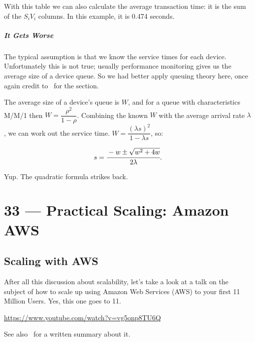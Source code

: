 \documentclass[a4paper]{report}
\begin{document}
With this table we can also calculate the average transaction time: it is the sum of the $S_{i}V_{i}$ columns. In this example, it is 0.474 seconds. 

\paragraph*{It Gets Worse}

The typical assumption is that we know the service times for each device. Unfortunately this is not true; usually performance monitoring gives us the average size of a device queue. So we had better apply queuing theory here, once again credit to~\cite{williams-calc} for the section. 

The average size of a device's queue is $W$, and for a queue with characteristics M/M/1 then $W = \dfrac{\rho^{2}}{1-\rho}$. Combining the known $W$ with the average arrival rate $\lambda$, we can work out the service time. $W = \dfrac{(\lambda s)^{2}}{1 - \lambda s}$, so:

\[ s = \cfrac{-w \pm \sqrt{w^{2}+4w}}{2\lambda}.\]

Yup. The quadratic formula strikes back. 









\chapter*{33 --- Practical Scaling: Amazon AWS}


\section*{Scaling with AWS}

After all this discussion about scalability, let's take a look at a talk on the subject of how to scale up using Amazon Web Services (AWS) to your first 11 Million Users. Yes, this one goes to 11.


\begin{center}
\url{https://www.youtube.com/watch?v=vg5onp8TU6Q}
\end{center}

See also~\cite{awsscale} for a written summary about it.
\end{document}
